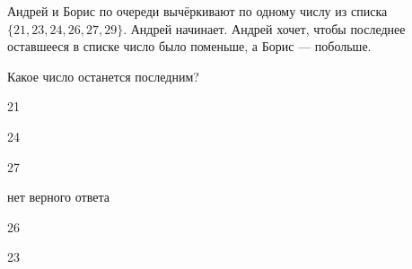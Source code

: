 
\begin{question}
Андрей и Борис по очереди вычёркивают по одному числу из списка \(\{21, 23, 24, 26, 27, 29\}\). Андрей начинает. Андрей хочет, чтобы последнее оставшееся в списке число было поменьше, а Борис --- побольше.

Какое число останется последним?
\begin{answerlist}
  \item 21
  \item 24
  \item 27
  \item нет верного ответа
  \item 26
  \item 23
\end{answerlist}
\end{question}


